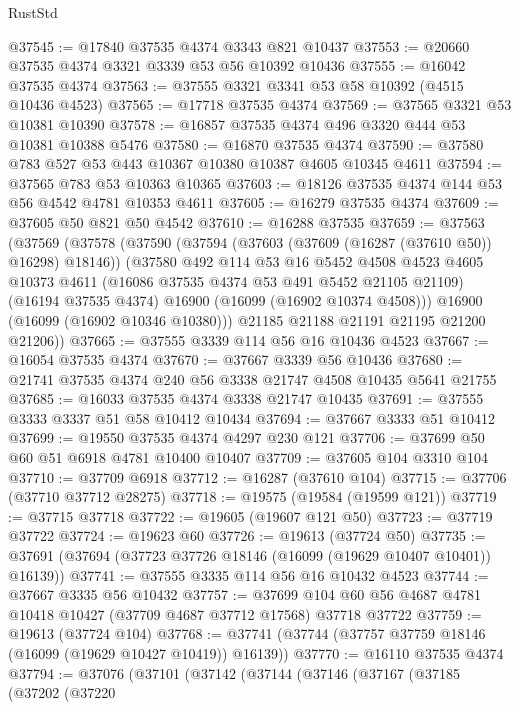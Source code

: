 \begin{lexlean}{RustStd}
\begin{coremodule}
@37545 := @17840 @37535 @4374 @3343 @821 @10437
@37553 := @20660 @37535 @4374 @3321 @3339 @53 @56 @10392 @10436
@37555 := @16042 @37535 @4374
@37563 := @37555 @3321 @3341 @53 @58 @10392 (@4515 @10436 @4523)
@37565 := @17718 @37535 @4374
@37569 := @37565 @3321 @53 @10381 @10390
@37578 := @16857 @37535 @4374 @496 @3320 @444 @53 @10381 @10388 @5476
@37580 := @16870 @37535 @4374
@37590 := @37580 @783 @527 @53 @443 @10367 @10380 @10387 @4605 @10345 @4611
@37594 := @37565 @783 @53 @10363 @10365
@37603 := @18126 @37535 @4374 @144 @53 @56 @4542 @4781 @10353 @4611
@37605 := @16279 @37535 @4374
@37609 := @37605 @50 @821 @50 @4542
@37610 := @16288 @37535
@37659 := @37563
    (@37569
      (@37578
        (@37590
          (@37594 (@37603 (@37609 (@16287 (@37610 @50)) @16298) @18146))
          (@37580
            @492
            @114
            @53
            @16
            @5452
            @4508
            @4523
            @4605
            @10373
            @4611
            (@16086 @37535 @4374 @53 @491 @5452 @21105 @21109)
            (@16194 @37535 @4374)
            @16900
            (@16099 (@16902 @10374 @4508)))
          @16900
          (@16099 (@16902 @10346 @10380)))
        @21185
        @21188
        @21191
        @21195
        @21200
        @21206))
@37665 := @37555 @3339 @114 @56 @16 @10436 @4523
@37667 := @16054 @37535 @4374
@37670 := @37667 @3339 @56 @10436
@37680 := @21741 @37535 @4374 @240 @56 @3338 @21747 @4508 @10435 @5641 @21755
@37685 := @16033 @37535 @4374 @3338 @21747 @10435
@37691 := @37555 @3333 @3337 @51 @58 @10412 @10434
@37694 := @37667 @3333 @51 @10412
@37699 := @19550 @37535 @4374 @4297 @230 @121
@37706 := @37699 @50 @60 @51 @6918 @4781 @10400 @10407
@37709 := @37605 @104 @3310 @104
@37710 := @37709 @6918
@37712 := @16287 (@37610 @104)
@37715 := @37706 (@37710 @37712 @28275)
@37718 := @19575 (@19584 (@19599 @121))
@37719 := @37715 @37718
@37722 := @19605 (@19607 @121 @50)
@37723 := @37719 @37722
@37724 := @19623 @60
@37726 := @19613 (@37724 @50)
@37735 := @37691 (@37694 (@37723 @37726 @18146 (@16099 (@19629 @10407 @10401)) @16139))
@37741 := @37555 @3335 @114 @56 @16 @10432 @4523
@37744 := @37667 @3335 @56 @10432
@37757 := @37699 @104 @60 @56 @4687 @4781 @10418 @10427 (@37709 @4687 @37712 @17568) @37718 @37722
@37759 := @19613 (@37724 @104)
@37768 := @37741 (@37744 (@37757 @37759 @18146 (@16099 (@19629 @10427 @10419)) @16139))
@37770 := @16110 @37535 @4374
@37794 := @37076
    (@37101
      (@37142
        (@37144
          (@37146
            (@37167
              (@37185
                (@37202
                  (@37220

\end{coremodule}
\end{lexlean}

